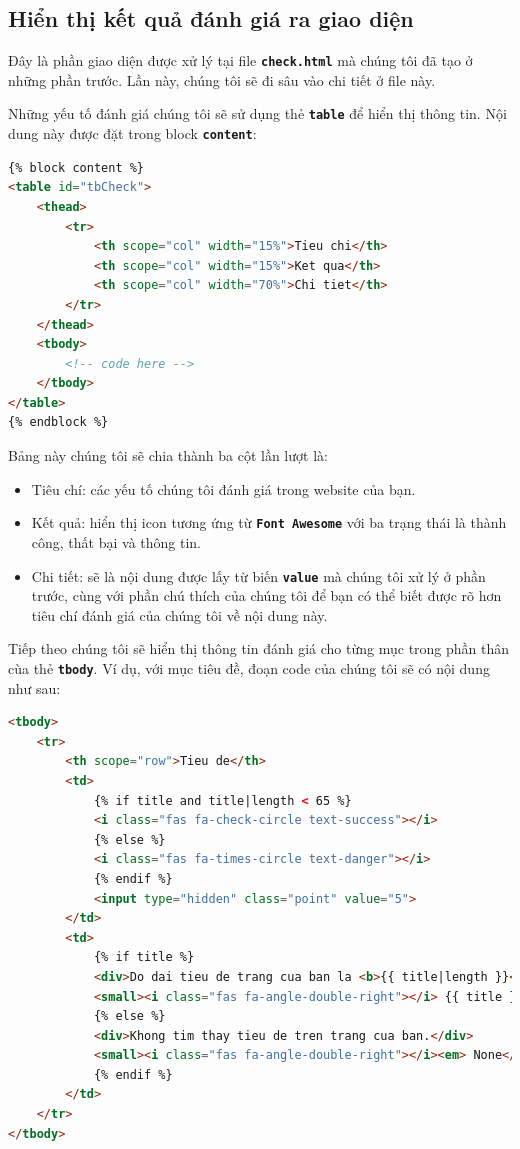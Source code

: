 \subsection{Hiển thị kết quả đánh giá ra giao diện}
Đây là phần giao diện được xử lý tại file \textbf{\texttt{check.html}} mà chúng tôi đã tạo ở những phần trước. Lần này, chúng tôi sẽ đi sâu vào chi tiết ở file này.
\par
Những yếu tố đánh giá chúng tôi sẽ sử dụng thẻ \textbf{\texttt{table}} để hiển thị thông tin. Nội dung này được đặt trong block \textbf{\texttt{content}}:
\begin{lstlisting}[language=html]
{% block content %}
<table id="tbCheck">
    <thead>
        <tr>
            <th scope="col" width="15%">Tieu chi</th>
            <th scope="col" width="15%">Ket qua</th>
            <th scope="col" width="70%">Chi tiet</th>
        </tr>
    </thead>
    <tbody>
        <!-- code here -->
    </tbody>
</table>
{% endblock %}
\end{lstlisting}
\par
Bảng này chúng tôi sẽ chia thành ba cột lần lượt là:
\begin{itemize}
    \item Tiêu chí: các yếu tố chúng tôi đánh giá trong website của bạn.
    \item Kết quả: hiển thị icon tương ứng từ \textbf{\texttt{Font Awesome}} với ba trạng thái là thành công, thất bại và thông tin.
    \item Chi tiết: sẽ là nội dung được lấy từ biến \textbf{\texttt{value}} mà chúng tôi xử lý ở phần trước, cùng với phần chú thích của chúng tôi để bạn có thể biết được rõ hơn tiêu chí đánh giá của chúng tôi về nội dung này.
\end{itemize}
\par
Tiếp theo chúng tôi sẽ hiển thị thông tin đánh giá cho từng mục trong phần thân cùa thẻ \textbf{\texttt{tbody}}. Ví dụ, với mục tiêu đề, đoạn code của chúng tôi sẽ có nội dung như sau:
\begin{lstlisting}[language=html]
<tbody>
    <tr>
        <th scope="row">Tieu de</th>
        <td>
            {% if title and title|length < 65 %}
            <i class="fas fa-check-circle text-success"></i>
            {% else %}
            <i class="fas fa-times-circle text-danger"></i>
            {% endif %}
            <input type="hidden" class="point" value="5">
        </td>
        <td>
            {% if title %}
            <div>Do dai tieu de trang cua ban la <b>{{ title|length }}</b> ky tu. Hau hat cac cong cu tim kiem se cat bot tieu de trang thanh 65 ky tu.</div>
            <small><i class="fas fa-angle-double-right"></i> {{ title }}</small>
            {% else %}
            <div>Khong tim thay tieu de tren trang cua ban.</div>
            <small><i class="fas fa-angle-double-right"></i><em> None</em></small>
            {% endif %}
        </td>
    </tr>
</tbody>
\end{lstlisting}
